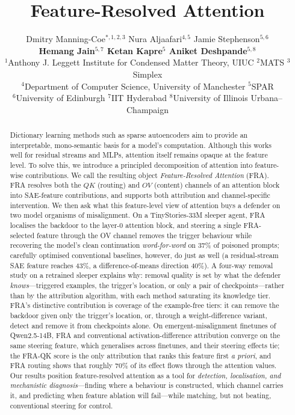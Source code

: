 \documentclass{article}
\title{Feature-Resolved Attention}
\author{%
  Dmitry Manning-Coe$^{*,1,2,3}$ \quad Nura Aljaafari$^{4,5}$ \quad Jamie Stephenson$^{5,6}$ \\
  {\bf Hemang Jain$^{5,7}$ \quad Ketan Kapre$^{5}$ \quad Aniket Deshpande$^{5,8}$} \\[1.2ex]
  \small $^{1}$Anthony J. Leggett Institute for Condensed Matter Theory, UIUC
    \quad $^{2}$MATS \quad $^{3}$Simplex \\
  \small $^{4}$Department of Computer Science, University of Manchester
    \quad $^{5}$SPAR \\
  \small $^{6}$University of Edinburgh \quad $^{7}$IIT Hyderabad
    \quad $^{8}$University of Illinois Urbana--Champaign \\
}
\theoremstyle{plain}
\theoremstyle{definition}
\theoremstyle{remark}
\begin{document}
\maketitle

\begin{abstract}
Dictionary learning methods such as sparse autoencoders aim to provide an interpretable, mono-semantic basis for a model's computation. Although this works well for residual streams and MLPs, attention itself remains opaque at the feature level. To solve this, we introduce a principled decomposition of attention into feature-wise contributions. We call the resulting object \textit{Feature-Resolved Attention} (FRA). FRA resolves both the $QK$ (routing) and $OV$ (content) channels of an attention block into SAE-feature contributions, and supports both attribution and channel-specific intervention. We then ask what this feature-level view of attention buys a defender on two model organisms of misalignment. On a TinyStories-33M sleeper agent, FRA localises the backdoor to the layer-0 attention block, and steering a single FRA-selected feature through the OV channel removes the trigger behaviour while recovering the model's clean continuation \emph{word-for-word} on 37\% of poisoned prompts; carefully optimised conventional baselines, however, do just as well (a residual-stream SAE feature reaches 43\%, a difference-of-means direction 40\%). A four-way removal study on a retrained sleeper explains why: removal quality is set by what the defender \emph{knows}---triggered examples, the trigger's location, or only a pair of checkpoints---rather than by the attribution algorithm, with each method saturating its knowledge tier. FRA's distinctive contribution is coverage of the example-free tiers: it can remove the backdoor given only the trigger's location, or, through a weight-difference variant, detect and remove it from checkpoints alone. On emergent-misalignment finetunes of Qwen2.5-14B, FRA and conventional activation-difference attribution converge on the same steering feature, which generalises across finetunes, and their steering effects tie; the FRA-QK score is the only attribution that ranks this feature first \emph{a priori}, and FRA routing shows that roughly 70\% of its effect flows through the attention values. Our results position feature-resolved attention as a tool for \emph{detection, localisation, and mechanistic diagnosis}---finding where a behaviour is constructed, which channel carries it, and predicting when feature ablation will fail---while matching, but not beating, conventional steering for control.
\end{abstract}
\end{document}
